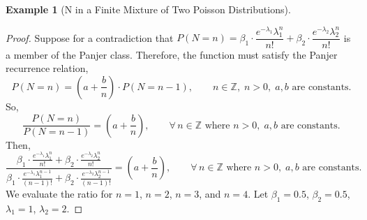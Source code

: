 \documentclass[11pt]{amsart}
\theoremstyle{definition}
\newtheorem{example}{Example}
\theoremstyle{plain}
\begin{document}
\begin{example}[N in a Finite Mixture of Two Poisson Distributions]
\begin{proof}
Suppose for a contradiction that
$P(N = n) = \beta_1 \cdot \dfrac{e^{-\lambda_1}\lambda_1^n}{n!}
           + \beta_2 \cdot \dfrac{e^{-\lambda_2}\lambda_2^n}{n!}$
is a member of the Panjer class.  Therefore, the function must satisfy the Panjer
recurrence relation,
\[
    P(N = n) = \left(a + \frac{b}{n}\right) \cdot P(N = n-1),
    \qquad n \in \mathbb{Z},\; n > 0,\; a, b \text{ are constants.}
\]
So,
\[
    \frac{P(N = n)}{P(N = n-1)} = \left(a + \frac{b}{n}\right),
    \qquad \forall\, n \in \mathbb{Z} \text{ where } n > 0,\; a, b \text{ are constants.}
\]
Then,
\[
    \frac{\displaystyle\beta_1 \cdot \frac{e^{-\lambda_1}\lambda_1^n}{n!}
        + \beta_2 \cdot \frac{e^{-\lambda_2}\lambda_2^n}{n!}}%
     {\displaystyle\beta_1 \cdot \frac{e^{-\lambda_1}\lambda_1^{n-1}}{(n-1)!}
        + \beta_2 \cdot \frac{e^{-\lambda_2}\lambda_2^{n-1}}{(n-1)!}}
    = \left(a + \frac{b}{n}\right),
    \qquad \forall\, n \in \mathbb{Z} \text{ where } n > 0,\; a, b \text{ are constants.}
\]
We evaluate the ratio for $n = 1$, $n = 2$, $n = 3$, and $n = 4$.
Let $\beta_1 = 0.5$, $\beta_2 = 0.5$, $\lambda_1 = 1$, $\lambda_2 = 2$.


\end{proof}
\end{example}
\end{document}
